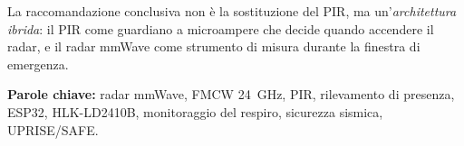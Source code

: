 La raccomandazione conclusiva non è la sostituzione del PIR, ma
un'\emph{architettura ibrida}: il PIR come guardiano a microampere che decide quando
accendere il radar, e il radar mmWave come strumento di misura durante la finestra
di emergenza.

\vspace{1em}
\begin{sloppypar}
\noindent\textbf{Parole chiave:} radar mmWave, FMCW 24~GHz, PIR, rilevamento di
presenza, ESP32, HLK-LD2410B, monitoraggio del respiro, sicurezza sismica,
UPRISE/SAFE.
\end{sloppypar}
